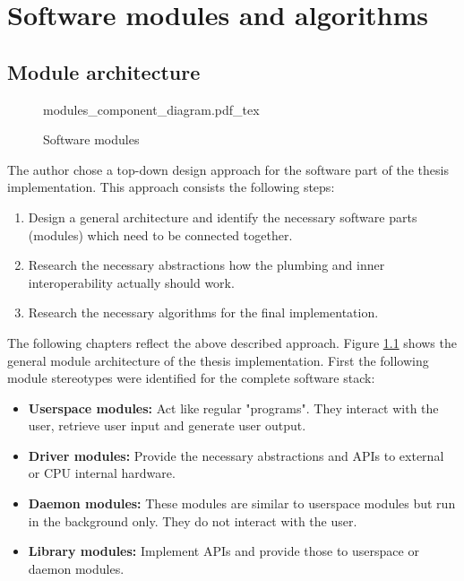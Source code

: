 \chapter{Software modules and algorithms}%
\section{Module architecture} %
\label{sec:module_architecture}

\begin{figure}[H]
\centering
{modules_component_diagram.pdf_tex}
\caption{Software modules}
\label{fig:modules}
\end{figure}

The author chose a top-down design approach for the software part of the thesis implementation. This approach consists the following steps:

\begin{enumerate}
    \item Design a general architecture and identify the necessary software parts (modules) which need to be connected together.
    \item Research the necessary abstractions how the plumbing and inner interoperability actually should work.
    \item Research the necessary algorithms for the final implementation.
\end{enumerate}

The following chapters reflect the above described approach. Figure \ref{fig:modules} shows the general module architecture of the thesis implementation. First the following module stereotypes were identified for the complete software stack:

\begin{itemize}
    \item \textbf{Userspace modules:} Act like regular "programs". They interact with the user, retrieve user input and generate user output.
    \item \textbf{Driver modules:} Provide the necessary abstractions and APIs to external or CPU internal hardware.
    \item \textbf{Daemon modules:} These modules are similar to userspace modules but run in the background only. They do not interact with the user.
    \item \textbf{Library modules:} Implement APIs and provide those to userspace or daemon modules.
\end{itemize}

